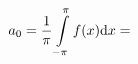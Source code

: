 \documentclass[preview]{standalone}
\begin{document}
\begin{center}
$\displaystyle{a_0=\frac{1}{\pi}\int\limits_{-\pi}^{\pi}f(x){\rm d}x}=$
\end{center}
\end{document}
